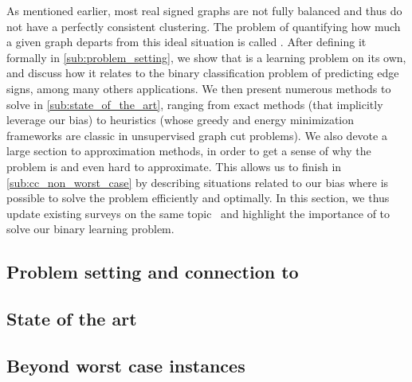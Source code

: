 As mentioned earlier, most real signed graphs are not fully balanced and thus do not have a
perfectly consistent clustering. The problem of quantifying how much a given graph departs from this
ideal situation is called \pcc{}. After defining it formally in \autoref{sub:problem_setting}, we
show that \pcc{} is a learning problem on its own, and discuss how it relates to the binary
classification problem of predicting edge signs, among many others applications. We then present
numerous methods to solve \pcc{} in \autoref{sub:state_of_the_art}, ranging from exact methods (that
implicitly leverage our bias) to heuristics (whose greedy and energy minimization frameworks are
classic in unsupervised graph cut problems). We also devote a large section to approximation
methods, in order to get a sense of why the problem is \NPc{} and even hard to approximate. This
allows us to finish in
\autoref{sub:cc_non_worst_case} by describing situations related to our bias where is possible to
solve the problem efficiently and optimally. In this section, we thus update existing surveys on the same
topic~\autocites{bonchi2014correlation}{surveyCC16}{CCWirth2017} and highlight the importance of
\pcc{} to solve our binary learning problem.


\subsection{Problem setting and connection to \esp{}}
\label{sub:problem_setting}


\subsection{State of the art}
\label{sub:state_of_the_art}



\subsection{Beyond worst case instances}
\label{sub:cc_non_worst_case}

